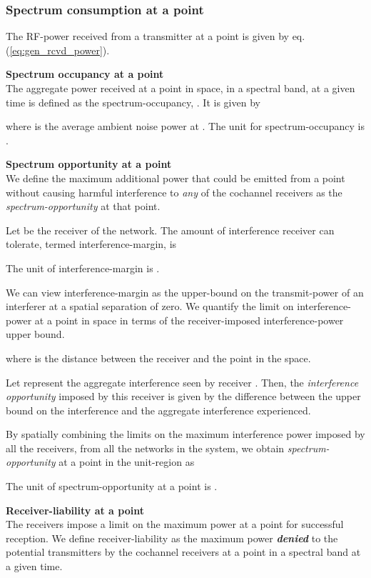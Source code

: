 \documentclass[journal,12pt,draftclsnofoot,onecolumn]{IEEEtran}
\begin{document}
\subsubsection{Spectrum consumption at a point}
The RF-power received from a transmitter at a point is given by eq.(\ref{eq:gen_rcvd_power}).

\noindent
\textbf{Spectrum occupancy at a point} \\
The aggregate power received at a point  in space, in a spectral band, at a given time is defined as the spectrum-occupancy, . It is given by

where  is the average ambient noise power at . The unit for spectrum-occupancy is .

\noindent
\textbf{Spectrum opportunity at a point} \\
We define the maximum additional power that could be emitted from a point without causing harmful interference to \textit{any} of the cochannel receivers as the \textit{spectrum-opportunity} at that point.

Let  be the  receiver of the  network. The amount of interference receiver  can tolerate, termed interference-margin, is 

The unit of interference-margin is .

We can view interference-margin  as the upper-bound on the transmit-power of an interferer at a spatial separation of zero. We quantify the limit on interference-power at a point  in space in terms of the receiver-imposed interference-power upper bound.

where  is the distance between the receiver  and the point  in the space. 

Let  represent the aggregate interference seen by receiver . Then, the \textit{interference opportunity} imposed by this receiver is given by the difference between the upper bound on the interference and the aggregate interference experienced.


By spatially combining the limits on the maximum interference power imposed by all the receivers, from all the networks in the system, we obtain \textit{spectrum-opportunity} at a point  in the unit-region as

The unit of spectrum-opportunity at a point is .

\noindent
\textbf{Receiver-liability at a point} \\
The receivers impose a limit on the maximum power at a point for successful reception. We define receiver-liability as the maximum power \textbf{\textit{denied}} to the potential transmitters by the cochannel receivers at a point in a spectral band at a given time.
\end{document}
